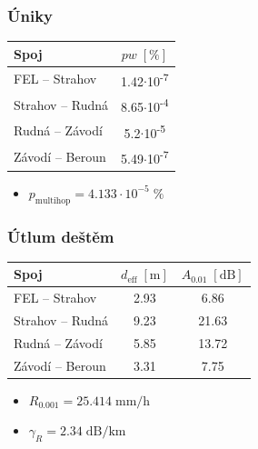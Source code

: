 \documentclass[aspectratio=169, 12pt, hyperref={unicode}]{beamer}
\begin{document}
\begin{frame}
\frametitle{Úniky}
\begin{table}[ht]
		\centering	
		\begin{tabular}[t]{|l||c|}
			\hline
			Spoj & $pw \; [\text{\%}]$\\
			\hline\hline
			FEL -- Strahov & 1.42$\cdot$10\textsuperscript{-7}\\  
			\hline
			Strahov -- Rudná & 8.65$\cdot$10\textsuperscript{-4}\\
			\hline
			Rudná -- Závodí & 5.2$\cdot$10\textsuperscript{-5} \\
			\hline
			Závodí -- Beroun & 5.49$\cdot$10\textsuperscript{-7} \\
			\hline
		\end{tabular}
	\end{table}
	\begin{itemize}
		\item $p_{\text{multihop}} = 4.133 \cdot 10^{-5} \; \text{\%}$
	\end{itemize}
\end{frame}

\begin{frame}
\frametitle{Útlum deštěm}
	\begin{table}[h!]
		\centering
		\begin{tabular}{| l || c | c |}
			\hline
			Spoj & $d_{\text{eff}} \; [\text{m}]$ & $A_{0.01} \; [\text{dB}]$\\
			\hline\hline
			FEL -- Strahov & 2.93 & 6.86\\
			\hline			
			Strahov -- Rudná & 9.23 & 21.63\\
			\hline
			Rudná -- Závodí & 5.85 & 13.72\\
			\hline
			Závodí -- Beroun & 3.31 & 7.75\\
			\hline
		\end{tabular}
	\end{table}
	\begin{itemize}
	\item $R_{0.001} = 25.414 \;\text{mm/h}$
	\item $\gamma_R = 2.34 \;\text{dB/km}$
	\end{itemize}
\end{frame}

\end{document}

